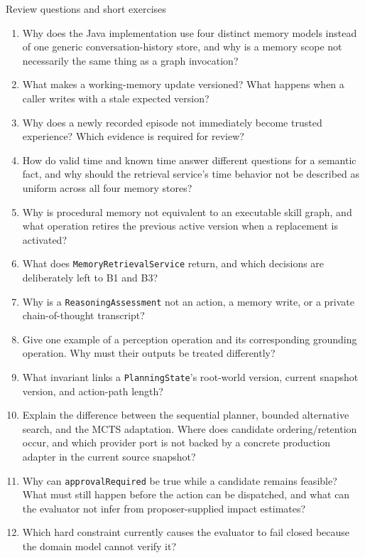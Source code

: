\begin{reviewquestions}{Review questions and short exercises}
\begin{enumerate}
  \item Why does the Java implementation use four distinct memory models instead of one generic conversation-history store, and why is a memory scope not necessarily the same thing as a graph invocation?
  \item What makes a working-memory update versioned? What happens when a caller writes with a stale expected version?
  \item Why does a newly recorded episode not immediately become trusted experience? Which evidence is required for review?
  \item How do valid time and known time answer different questions for a semantic fact, and why should the retrieval service's time behavior not be described as uniform across all four memory stores?
  \item Why is procedural memory not equivalent to an executable skill graph, and what operation retires the previous active version when a replacement is activated?
  \item What does \texttt{MemoryRetrievalService} return, and which decisions are deliberately left to B1 and B3?
  \item Why is a \texttt{ReasoningAssessment} not an action, a memory write, or a private chain-of-thought transcript?
  \item Give one example of a perception operation and its corresponding grounding operation. Why must their outputs be treated differently?
  \item What invariant links a \texttt{PlanningState}'s root-world version, current snapshot version, and action-path length?
  \item Explain the difference between the sequential planner, bounded alternative search, and the MCTS adaptation. Where does candidate ordering/retention occur, and which provider port is not backed by a concrete production adapter in the current source snapshot?
  \item Why can \texttt{approvalRequired} be true while a candidate remains feasible? What must still happen before the action can be dispatched, and what can the evaluator not infer from proposer-supplied impact estimates?
  \item Which hard constraint currently causes the evaluator to fail closed because the domain model cannot verify it?
\end{enumerate}
\end{reviewquestions}

